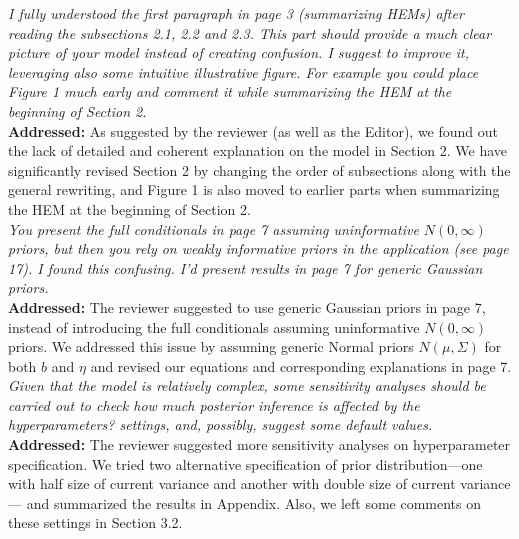 \documentclass[12pt]{article}
\newcommand{\grey}[1]{{\color{mygrey}#1}}
\theoremstyle{definition}
\begin{document}
 \grey{\emph{I fully understood the first paragraph in page 3 (summarizing HEMs) after reading the subsections 2.1, 2.2 and 2.3. This part should provide a much clear picture of your model instead of creating confusion. I suggest to improve it, leveraging also some intuitive illustrative figure. For example you could place Figure 1 much early and comment it while summarizing the HEM at the beginning of Section 2.}}\\

\noindent \textcolor{MyGreen}{\textbf{Addressed:}} As suggested by the reviewer (as well as the Editor), we found out the lack of detailed and coherent explanation on the model in Section 2. We have significantly revised Section 2 by changing the order of subsections along with the general rewriting, and Figure 1 is also moved to earlier parts when summarizing the HEM at the beginning of Section 2. \\


 \grey{\emph{You present the full conditionals in page 7 assuming uninformative $N(0, \infty)$ priors, but then you rely on weakly informative priors in the application (see page 17). I found this confusing. I'd present results in page 7 for generic Gaussian priors.}}\\

\noindent \textcolor{MyGreen}{\textbf{Addressed:}} The reviewer suggested to use generic Gaussian priors in page 7, instead of introducing the full conditionals assuming uninformative $N(0, \infty)$ priors. We addressed this issue by assuming generic Normal priors $N(\mu, \Sigma)$ for both $b$ and $\eta$ and revised our equations and corresponding explanations in page 7.\\


 \grey{\emph{Given that the model is relatively complex, some sensitivity analyses should be carried out to check how much posterior inference is affected by the hyperparameters? settings, and, possibly, suggest some default values.}}\\

\noindent \textcolor{MyGreen}{\textbf{Addressed:}} The reviewer suggested more sensitivity analyses on hyperparameter specification. We tried two alternative specification of prior distribution---one with half size of current variance and another with double size of current variance--- and summarized the results in Appendix. Also, we left some comments on these settings in Section 3.2.\\
\end{document}
